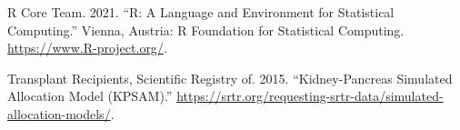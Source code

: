 \documentclass[
]{article}
\newlength{\cslhangindent}
\newlength{\cslentryspacingunit} %
\newenvironment{CSLReferences}[2] %
 {%
  \setlength{\parindent}{0pt}
  \ifodd #1
  \let\oldpar\par
  \def\par{\hangindent=\cslhangindent\oldpar}
  \fi
  \setlength{\parskip}{#2\cslentryspacingunit}
 }%
 {}
\begin{document}
\begin{CSLReferences}{1}{0}
\leavevmode{}%
R Core Team. 2021. {``R: A Language and Environment for Statistical
Computing.''} Vienna, Austria: R Foundation for Statistical Computing.
\url{https://www.R-project.org/}.

\leavevmode{}%
Transplant Recipients, Scientific Registry of. 2015. {``Kidney-Pancreas
Simulated Allocation Model (KPSAM).''}
\url{https://srtr.org/requesting-srtr-data/simulated-allocation-models/}.

\end{CSLReferences}
\end{document}
